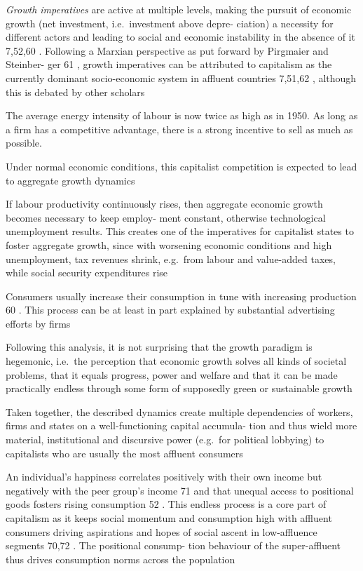 \documentclass[
]{book}
\begin{document}
\emph{Growth imperatives} are active at multiple levels, making the pursuit of
economic growth (net investment, i.e.~investment above depre-
ciation) a necessity for different actors and leading to social and
economic instability in the absence of it 7,52,60 . Following a
Marxian perspective as put forward by Pirgmaier and Steinber-
ger 61 , growth imperatives can be attributed to capitalism as the
currently dominant socio-economic system in affluent
countries 7,51,62 , although this is debated by other scholars

The average energy intensity of labour is
now twice as high as in 1950. As long as a firm has a
competitive advantage, there is a strong incentive to sell as much
as possible.

Under normal economic conditions, this
capitalist competition is expected to lead to aggregate growth
dynamics

If labour productivity continuously rises, then
aggregate economic growth becomes necessary to keep employ-
ment constant, otherwise technological unemployment results.
This creates one of the imperatives for capitalist states to foster
aggregate growth, since with worsening economic conditions and
high unemployment, tax revenues shrink, e.g.~from labour and
value-added taxes, while social security expenditures rise

Consumers
usually increase their consumption in tune with increasing
production 60 . This process can be at least in part explained by
substantial advertising efforts by firms

Following this analysis, it is not surprising that the growth
paradigm is hegemonic, i.e.~the perception that economic growth
solves all kinds of societal problems, that it equals progress, power
and welfare and that it can be made practically endless through
some form of supposedly green or sustainable growth

Taken
together, the described dynamics create multiple dependencies of
workers, firms and states on a well-functioning capital accumula-
tion and thus wield more material, institutional and discursive
power (e.g.~for political lobbying) to capitalists who are usually
the most affluent consumers

An individual's happiness correlates
positively with their own income but negatively with the peer
group's income 71 and that unequal access to positional goods
fosters rising consumption 52 . This endless process is a core part
of capitalism as it keeps social momentum and consumption high
with affluent consumers driving aspirations and hopes of social
ascent in low-affluence segments 70,72 . The positional consump-
tion behaviour of the super-affluent thus drives consumption
norms across the population
\end{document}
